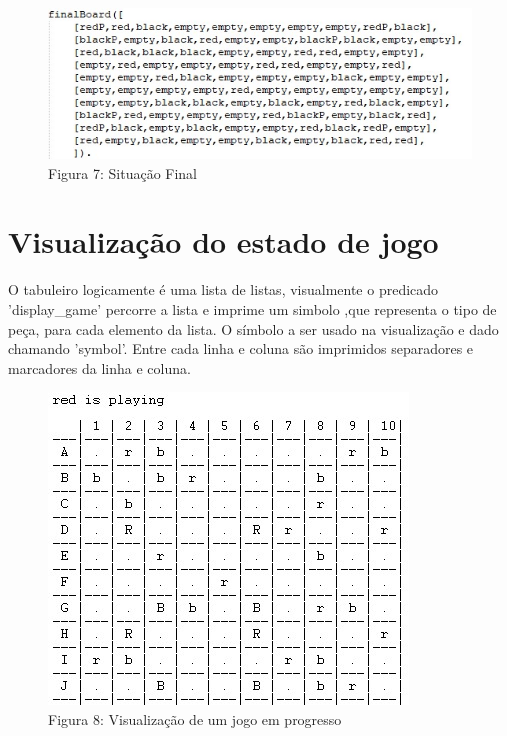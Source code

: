\documentclass[11pt]{article}
\begin{document}
\begin{center}
\begin{figure}[h]
 \begin{center}
\includegraphics[scale=0.7]{fig7.jpg}
\caption*{Figura 7: Situação Final}
\end{center}
\end{figure}
\end{center}

\newpage
\thispagestyle{fancy}
\fancyhf{}
\fancyfoot[R]{\thepage}
\renewcommand*{\footrulewidth}{1pt}

\section*{Visualização do estado de jogo}
O tabuleiro logicamente é uma lista de listas, visualmente o predicado 'display\_game' percorre a lista e imprime um simbolo ,que representa o tipo de peça, para cada elemento da lista. O símbolo a ser usado na visualização e dado chamando 'symbol'. Entre cada linha e coluna são imprimidos separadores e marcadores da linha e coluna.

\begin{figure}[h]
 \begin{center}
\includegraphics[scale=0.7]{fig8.jpg}
\caption*{Figura 8: Visualização de um jogo em progresso}
\end{center}
\end{figure}
\end{document}
